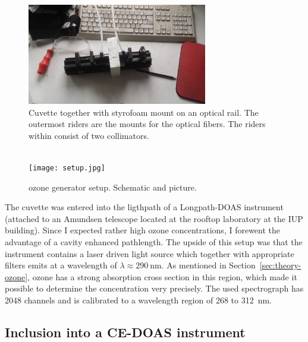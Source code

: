 \begin{figure}[htbp]
  \centering
  \includegraphics[width=0.7\textwidth]{images/cuvette.jpg}
  \caption{Cuvette together with styrofoam mount on an optical
    rail. The outermost riders are the mounts for the optical
    fibers. The riders within consist of two collimators.}
  \label{fig:cuvette}
\end{figure}

\begin{figure}[htbp]
  \centering
  {
  \def\svgwidth{0.9\linewidth}
  
  }
  \phantom{h}\\
  \vspace{2cm}
  \texttt{[image: setup.jpg]}
  \caption{ozone generator setup. Schematic and picture.}
  \label{fig:setup}
\end{figure}

The cuvette was entered into the ligthpath of a Longpath-DOAS
instrument (attached to an Amundsen telescope located at the rooftop
laboratory at the IUP building). Since I expected rather high ozone
concentrations, I forewent the advantage of a cavity enhanced
pathlength. The upside of this setup was that the instrument contains
a laser driven light source which together with appropriate filters
emits at a wavelength of $\lambda \approx \SI{290}{\nano\meter}$. As
mentioned in Section~\ref{sec:theory-ozone}, ozone has a strong
absorption cross section in this region, which made it possible to
determine the concentration very precisely. The used spectrograph has
2048 channels and is calibrated to a wavelength region of \num{268} to
\SI{312}{\nano\meter}.

\subsection{Inclusion into a CE-DOAS instrument}
\label{sec:inclusion}

